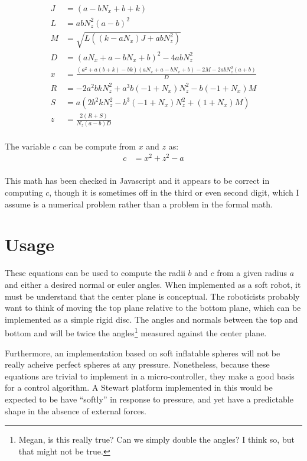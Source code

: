 \documentclass{article}
\begin{document}
\begin{align*}
  J &= (a-b N_x+b+k) \\
  L &= a b N_z^2 (a-b)^2  \\
  M &= \sqrt{L  \left((k - a  N_x) J +a b
    N_z^2\right)}\\
  D &= (a N_x+a-b N_x+b)^2-4 a b N_z^2 \\
  x &= \frac{\left(a^2+a (b+k)-b
    k\right)
    (a N_x+a-b N_x+b) - 2 M -2 a b N_z^2 (a+b)}{D} \\
  R &=   -2 a^2 b k N_z^2 + a^3b(-1 + N_x) N_z^2 - b(-1 + N_x)M  \\
    S &= a (2 b^2 k N_z^2 - b^3(-1 + N_x)N_z^2 + (1 +N_x) M )
     \\
     z &= \frac{2 (R + S)}{N_z (a-b) D}\\
\end{align*}

The variable $c$ can be compute from $x$ and $z$ as:
\begin{align*}
    c &= x^2 + z^2 -a \\
\end{align*}

This math has been checked in Javascript and it appears to
be correct in computing $c$,
though it is sometimes off in the third or even second digit,
which I assume is a numerical problem
rather than a problem in the formal math.

\section{Usage}

These equations can be used to compute the radii $b$ and $c$
from a given radius $a$ and either a desired normal or euler
angles. When implemented as a soft robot, it must be understand
that the center plane is conceptual. The roboticists probably
want to think of moving the top plane relative to the bottom plane,
which can be implemented as a simple rigid disc.
The angles and normals between the top and bottom and will be
twice the angles\footnote{Megan, is this really true? Can we simply double the angles? I think so, but that might not be true.} measured against the center plane.

Furthermore, an implementation based on soft inflatable spheres
will not be really acheive perfect spheres at any pressure.
Nonetheless, because these equations are trivial to implement
in a micro-controller, they make a good basis for a control
algorithm. A Stewart platform implemented in this would
be expected to be have ``softly'' in response to pressure,
and yet have a predictable shape in the absence of external
forces.

\printbibliography
\end{document}
